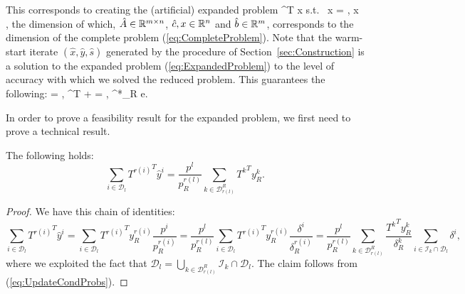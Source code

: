 This corresponds to creating the (artificial) expanded problem
\be \label{eq:ExpandedProblem}
\min\; ^T x \;\quad \mbox{s.t. }\;  x = ,
    \; x ,
\ee
the dimension of which, $\hat{A} \in \mathbb{R}^{m\times n}$, 
$\hat{c}, x \in \mathbb{R}^{n}$ and $\hat{b} \in \mathbb{R}^{m}$,
corresponds to the dimension of the complete problem 
(\ref{eq:CompleteProblem}).
%
Note that the warm-start iterate $(\hat{x},\hat{y},\hat{s})$
generated by the procedure of Section~\ref{sec:Construction}
is a solution to the expanded problem (\ref{eq:ExpandedProblem}) 
to the level of accuracy with which we solved the reduced problem.
This guarantees the following:
\be  \label{eq:ExpandedSolutionProperties}
  = , \qquad
{}^T  +  = , \qquad
{}  \approx \mu^*_R e.
\ee

In order to prove a feasibility result for the expanded problem,
we first need to prove a technical result.

\begin{lemma}  \label{th:SumOfTerms}
The following holds:
\[
\sum_{i \in \mathcal{D}_{l}} {T^{r(i)}}^T \hat y^i
  = \frac{p^{l}}{p^{r(l)}_R}\sum_{k \in \mathcal{D}_{r(l)}^R}
    {T^k}^T y^k_R.
\]
\end{lemma}
%
\begin{proof}
We have this chain of identities:
\[
\sum_{i \in \mathcal{D}_{l}} {T^{r(i)}}^T \hat y^i
  = \sum_{i\in\mathcal{D}_{l}} {T^{r(i)}}^T y^{r(i)}_R\frac{p^i}{p^{r(i)}_R}
  = \frac{p^{l}}{p^{r(l)}_R}\sum_{i \in \mathcal{D}_{l}} {T^{r(i)}}^T
    y^{r(i)}_R \frac{\delta^i}{\delta_R^{r(i)}}
  = \frac{p^{l}}{p^{r(l)}_R}\! \sum_{k \in \mathcal{D}_{r(l)}^R} \!\!
       \frac{{T^k}^T y^k_R}{\delta_R^k}
       \sum_{i \in \mathcal{I}_k \cap \mathcal{D}_{l}}\!\!\! \delta^{i},
\]
where we exploited the fact that
\(
  \mathcal{D}_{l} = \bigcup_{k \in \mathcal{D}_{r(l)}^R}
     \mathcal{I}_{k} \cap \mathcal{D}_{l}.
\)
The claim follows from (\ref{eq:UpdateCondProbs}).
\end{proof}

